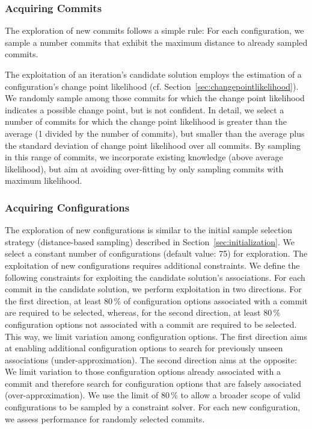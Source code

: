 \documentclass[sigconf]{acmart}
\begin{document}
	\subsubsection{Acquiring Commits}
	The exploration of new commits follows a simple rule: For each configuration, we sample a number commits that exhibit the maximum distance to already sampled commits. 
	
	The exploitation of an iteration's candidate solution employs the estimation of a configuration's change point likelihood (cf. Section~\ref{sec:changepointlikelihood}). We randomly sample among those commits for which the change point likelihood indicates a possible change point, but is not confident. In detail, we select a number of commits for which the change point likelihood is greater than the average (1 divided by the number of commits), but smaller than the average plus the standard deviation of change point likelihood over all commits. By sampling in this range of commits, we incorporate existing knowledge (above average likelihood), but aim at avoiding over-fitting by only sampling commits with maximum likelihood.
	
	\subsubsection{Acquiring Configurations}
	The exploration of new configurations is similar to the initial sample selection strategy (distance-based sampling) described in Section~\ref{sec:initialization}. We select a constant number of configurations (default value: 75) for exploration. The exploitation of new configurations requires additional constraints. We define the following constraints for exploiting the candidate solution's associations. {\color{blue}For each commit in the candidate solution, we perform exploitation in two directions. For the first direction, at least 80\,\% of  configuration options associated with a commit are required to be selected, whereas, for the second direction, at least 80\,\% configuration options not associated with a commit are required to be selected. This way, we limit variation among configuration options. The first direction aims at enabling additional configuration options to search for previously unseen associations (under-approximation). The second direction aims at the opposite: We limit variation to those configuration options already associated with a commit and therefore search for configuration options that are falsely associated (over-approximation). We use the limit of 80\,\% to allow a broader scope of valid configurations to be sampled by a constraint solver. For each new configuration, we assess performance for randomly selected commits.}
	
\end{document}
